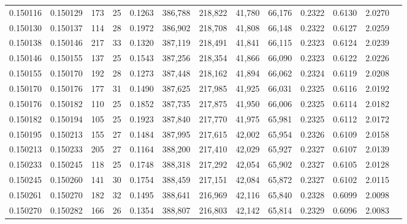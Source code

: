 \begin{tabular}{rrrrrrrrrrrrr}
0.150116 & 0.150129 & 173 &  25 &                                     0.1263 & 386,788 & 218,822 &  41,780 &  66,176 & 0.2322 & 0.6130 & 2.0270 \\
0.150130 & 0.150137 & 114 &  28 &                                     0.1972 & 386,902 & 218,708 &  41,808 &  66,148 & 0.2322 & 0.6127 & 2.0259 \\
0.150138 & 0.150146 & 217 &  33 &                                     0.1320 & 387,119 & 218,491 &  41,841 &  66,115 & 0.2323 & 0.6124 & 2.0239 \\
0.150146 & 0.150155 & 137 &  25 &                                     0.1543 & 387,256 & 218,354 &  41,866 &  66,090 & 0.2323 & 0.6122 & 2.0226 \\
0.150155 & 0.150170 & 192 &  28 &                                     0.1273 & 387,448 & 218,162 &  41,894 &  66,062 & 0.2324 & 0.6119 & 2.0208 \\
0.150170 & 0.150176 & 177 &  31 &                                     0.1490 & 387,625 & 217,985 &  41,925 &  66,031 & 0.2325 & 0.6116 & 2.0192 \\
0.150176 & 0.150182 & 110 &  25 &                                     0.1852 & 387,735 & 217,875 &  41,950 &  66,006 & 0.2325 & 0.6114 & 2.0182 \\
0.150182 & 0.150194 & 105 &  25 &                                     0.1923 & 387,840 & 217,770 &  41,975 &  65,981 & 0.2325 & 0.6112 & 2.0172 \\
0.150195 & 0.150213 & 155 &  27 &                                     0.1484 & 387,995 & 217,615 &  42,002 &  65,954 & 0.2326 & 0.6109 & 2.0158 \\
0.150213 & 0.150233 & 205 &  27 &                                     0.1164 & 388,200 & 217,410 &  42,029 &  65,927 & 0.2327 & 0.6107 & 2.0139 \\
0.150233 & 0.150245 & 118 &  25 &                                     0.1748 & 388,318 & 217,292 &  42,054 &  65,902 & 0.2327 & 0.6105 & 2.0128 \\
0.150245 & 0.150260 & 141 &  30 &                                     0.1754 & 388,459 & 217,151 &  42,084 &  65,872 & 0.2327 & 0.6102 & 2.0115 \\
0.150261 & 0.150270 & 182 &  32 &                                     0.1495 & 388,641 & 216,969 &  42,116 &  65,840 & 0.2328 & 0.6099 & 2.0098 \\
0.150270 & 0.150282 & 166 &  26 &                                     0.1354 & 388,807 & 216,803 &  42,142 &  65,814 & 0.2329 & 0.6096 & 2.0083 \\

\end{tabular}
